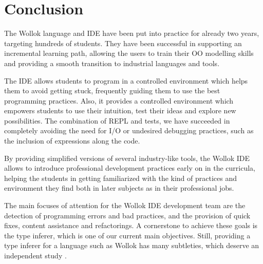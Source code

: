 \section{Conclusion}
\label{sec:conclusion}


The Wollok language and IDE have been put into practice for already two years, targeting hundreds of students.
They have been successful in supporting an incremental learning path, 
allowing the users to train their OO modelling skills
and providing a smooth transition to industrial languages and tools.


The IDE allows students to program in a controlled environment which helps them to avoid getting stuck, 
frequently guiding them to use the best programming practices.
Also, it provides a controlled environment which empowers students to use their intuition, test their ideas and explore new possibilities.
The combination of REPL and tests, we have succeeded in completely avoiding the need for I/O or undesired debugging practices, such as the inclusion of  expressions along the code.

By providing simplified versions of several industry-like tools, the Wollok IDE allows to introduce professional development practices early on in the curricula,
helping the students in getting familiarized with the kind of practices and environment they find both in later subjects as in their professional jobs.

\medskip
The main focuses of attention for the Wollok IDE development team are the detection of programming errors and bad practices, and the provision of quick fixes, content assistance and refactorings.
A cornerstone to achieve these goals is the type inferer, which is one of our current main objectives.
Still, providing a type inferer for a language such as Wollok has many subtleties, which deserve an independent study \cite{passerini_nicolas_extensible_2014}.

